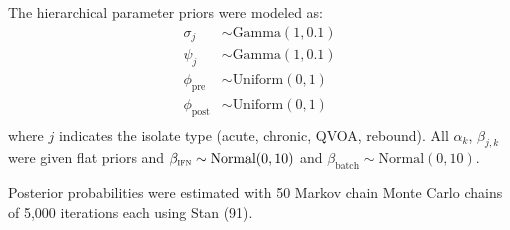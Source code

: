 \documentclass[12pt]{article}
\newcommand{\stanRef}{(91)}
\begin{document}
The hierarchical parameter priors were modeled as:
  \begin{align*}
    \sigma_j & \sim \text{Gamma}(1,0.1)\\
    \psi_j & \sim \text{Gamma}(1,0.1)\\
    \phi_{\text{pre}} & \sim \text{Uniform}(0,1)\\
    \phi_{\text{post}} & \sim \text{Uniform}(0,1)\\
  \end{align*}
where $j$ indicates the isolate type (acute, chronic, QVOA, rebound). All $\alpha_k$, $\beta_{j,k}$ were given flat priors and $\beta_{\text{\textsc{ifn}}}\sim\text{Normal}(0,10)$ and $\beta_{\text{batch}}\sim\text{Normal}(0,10)$.

Posterior probabilities were estimated with 50 Markov chain Monte Carlo chains of 5,000 iterations each using Stan \stanRef{}.
\end{document}
